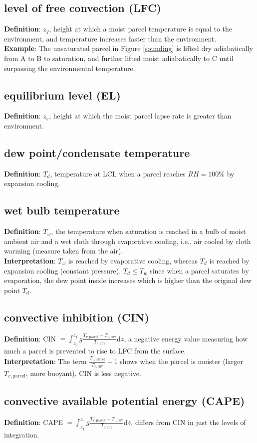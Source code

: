 \subsection{level of free convection (LFC)}
{\bf Definition}: $z_f$, height at which a moist parcel temperature is equal to the environment,
and temperature increases faster than the environment. \\

{\bf Example}: The unsaturated parcel in Figure {\ref{sounding}} is lifted dry adiabatically from A
to B to saturation, and further lifted moist adiabatically to C until surpassing the environmental
temperature.

\subsection{equilibrium level (EL)}
{\bf Definition}: $z_e$, height at which the moist parcel lapse rate is greater than environment.

\subsection{dew point/condensate temperature}
{\bf Definition}: $T_d$, temperature at LCL when a parcel reaches $RH=100\%$ by expansion cooling.

\subsection{wet bulb temperature}
{\bf Definition}: $T_w$, the temperature when saturation is reached in a bulb of moist ambient air
and a wet cloth through evaporative cooling, i.e., air cooled by cloth warming (measure taken from
the air). \\ 

{\bf Interpretation}: $T_w$ is reached by evaporative cooling, whereas $T_d$ is
reached by expansion cooling (constant pressure). $T_d \le T_w$ since when a parcel saturates by
evaporation, the dew point inside increases which is higher than the original dew point $T_d$.

\subsection{convective inhibition (CIN)}
{\bf Definition}: 
CIN $=\int_{z_0}^{z_f} g \frac{T_{v,\text{parcel}} - T_{v,\text{env}}}{T_{v,\text{env}}} $d$z$, 
a negative energy value measuring how much a parcel is prevented to rise to LFC from the surface. \\

{\bf Interpretation}: The term $\frac{T_{v,\text{parcel}}}{T_{v,\text{env}}} -
1$ shows when the parcel is moister (larger $T_{v,\text{parcel}}$, more buoyant), CIN is less negative.

\subsection{convective available potential energy (CAPE)}
{\bf Definition}: 
CAPE $=\int_{z_f}^{z_e} g \frac{T_{v,\text{parcel}} - T_{v,\text{env}}}{T_{v,\text{env}}} $d$z$,
differs from CIN in just the levels of integration.




